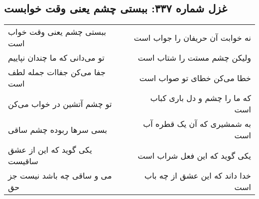 \begin{center}
\section*{غزل شماره ۳۳۷: ببستی چشم یعنی وقت خوابست}
\label{sec:0337}
\begin{longtable}{l p{0.5cm} r}
ببستی چشم یعنی وقت خواب است
&&
نه خوابت آن حریفان را جواب است
\\
تو می‌دانی که ما چندان نپاییم
&&
ولیکن چشم مستت را شتاب است
\\
جفا می‌کن جفاات جمله لطف است
&&
خطا می‌کن خطای تو صواب است
\\
تو چشم آتشین در خواب می‌کن
&&
که ما را چشم و دل باری کباب است
\\
بسی سرها ربوده چشم ساقی
&&
به شمشیری که آن یک قطره آب است
\\
یکی گوید که این از عشق ساقیست
&&
یکی گوید که این فعل شراب است
\\
می و ساقی چه باشد نیست جز حق
&&
خدا داند که این عشق از چه باب است
\\
\end{longtable}
\end{center}
